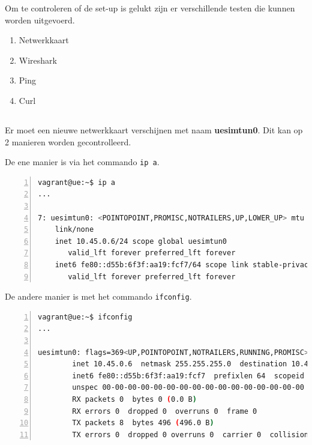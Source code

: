 Om te controleren of de set-up is gelukt zijn er verschillende testen die kunnen worden uitgevoerd.

\begin{enumerate}
    \item Netwerkkaart
    \item Wireshark
    \item Ping
    \item Curl
\end{enumerate}

\subsection{}%
\label{sec:Test-NIC}%

Er moet een nieuwe netwerkkaart verschijnen met naam \textbf{uesimtun0}.
Dit kan op 2 manieren worden gecontrolleerd.

De ene manier is via het commando \lstinline!ip a!.
\begin{lstlisting}[basicstyle=\small, frame=single, breaklines=true, postbreak=\mbox{\textcolor{red}{$\hookrightarrow$}\space}, escapeinside ={\%,}, escapechar={!}, numbers=left, language=sh, caption=Test - ip a]
vagrant@ue:~$ ip a
... 

7: uesimtun0: <POINTOPOINT,PROMISC,NOTRAILERS,UP,LOWER_UP> mtu 1400 qdisc fq_codel state UNKNOWN group default qlen 500
    link/none
    inet 10.45.0.6/24 scope global uesimtun0
       valid_lft forever preferred_lft forever
    inet6 fe80::d55b:6f3f:aa19:fcf7/64 scope link stable-privacy
       valid_lft forever preferred_lft forever
\end{lstlisting}


De andere manier is met het commando \lstinline!ifconfig!.
\begin{lstlisting}[basicstyle=\small, frame=single, breaklines=true, postbreak=\mbox{\textcolor{red}{$\hookrightarrow$}\space}, escapeinside ={\%,}, escapechar={!}, numbers=left, language=sh, caption=Test - ifconfig]
vagrant@ue:~$ ifconfig
...

uesimtun0: flags=369<UP,POINTOPOINT,NOTRAILERS,RUNNING,PROMISC>  mtu 1400
        inet 10.45.0.6  netmask 255.255.255.0  destination 10.45.0.6
        inet6 fe80::d55b:6f3f:aa19:fcf7  prefixlen 64  scopeid 0x20<link>
        unspec 00-00-00-00-00-00-00-00-00-00-00-00-00-00-00-00  txqueuelen 500  (UNSPEC)
        RX packets 0  bytes 0 (0.0 B)
        RX errors 0  dropped 0  overruns 0  frame 0
        TX packets 8  bytes 496 (496.0 B)
        TX errors 0  dropped 0 overruns 0  carrier 0  collisions 0
\end{lstlisting}

